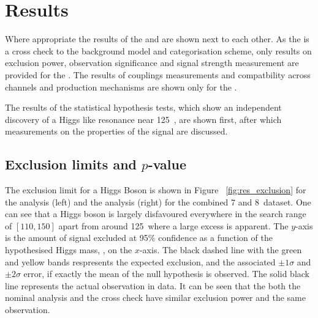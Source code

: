 \chapter{Results}
\label{chap:results}

Where appropriate the results of the \MFM and \SMVA are shown next to each other. As the \SMVA is a cross check to the background model and categorisation scheme, only results on exclusion power, observation significance and signal strength measurement are provided for the \SMVA. The results of couplings measurements and compatbility across channels and production mechanisms are shown only for the \MFM.

The results of the statistical hypothesis tests, which show an independent discovery of a Higgs like resonance near 125~\GeV, are shown first, after which measurements on the properties of the signal are discussed.

\section{Exclusion limits and $p$-value}

The exclusion limit for a \SM Higgs Boson is shown in Figure ~\ref{fig:res_exclusion} for the \MFM analysis (left) and the \SMVA analysis (right) for the combined 7 and 8~\TeV dataset. One can see that a \SM Higgs boson is largely disfavoured everywhere in the search range of $[110,150]$ apart from around 125~\GeV where a large excess is apparent. The $y$-axis is the amount of \SM signal excluded at 95\% confidence as a function of the hypothesised Higgs mass, \mH, on the $x$-axis. The black dashed line with the green and yellow bands respresents the expected exclusion, and the associated $\pm1\sigma$ and $\pm2\sigma$ error, if exactly the mean of the null hypothesis is observed. The solid black line represents the actual observation in data. It can be seen that the both the nominal \MFM analysis and the cross check \SMVA have similar exclusion power and the same observation.

